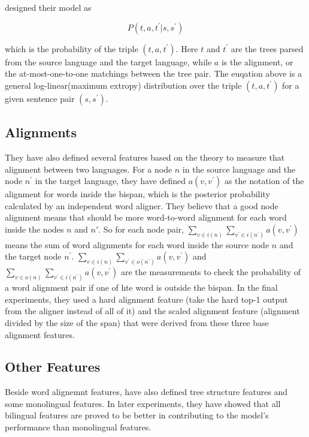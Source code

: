 \documentclass[11pt]{article} %
\begin{document}
\cite{Burkett:2008:TLB:1613715.1613828} designed their model as

\begin{equation}
    P(t, a, t^\prime|s, s^\prime)
\end{equation}

which is the probability of the triple $(t, a, t^\prime)$. Here $t$ and $t^\prime$ are the trees parsed from the source language and the target language, while $a$ is the alignment, or the at-most-one-to-one matchings between the tree pair. The euqation above is a general log-linear(maximum extropy) distribution over the triple $(t, a, t^\prime)$ for a given sentence pair $(s, s^\prime)$.

\subsection{Alignments}

They have also defined several features based on the theory to measure that alignment between two languages. For a node $n$ in the source language and the node $n^\prime$ in the target language, they have defined $a(v, v^\prime)$ as the notation of the alignment for words inside the bispan, which is the posterior probability calculated by an independent word aligner. They believe that a good node alignment means that should be more word-to-word alignment for each word inside the nodes $n$ and $n\prime$. So for each node pair, $\sum_{v\in i(n)}\sum_{v^\prime\in i(n^\prime)}a(v, v^\prime)$ means the sum of word alignments for each word inside the source node $n$ and the target node $n^\prime$. $\sum_{v\in i(n)}\sum_{v^\prime\in o(n^\prime)}a(v, v^\prime)$ and $\sum_{v\in o(n)}\sum_{v^\prime\in i(n^\prime)}a(v, v^\prime)$ are the measurements to check the probability of a word alignment pair if one of hte word is outside the bispan. In the final experiments, they used a hard alignment feature (take the hard top-1 output from the aligner instead of all of it) and the scaled alignment feature (alignment divided by the size of the span) that were derived from these three base alignment features.

\subsection{Other Features}

Beside word alignemnt features, \cite{Burkett:2008:TLB:1613715.1613828} have also defined tree structure features and some monolingual features. In later experiments, they have showed that all bilingual features are proved to be better in contributing to the model's performance than monolingual features.
\end{document}
